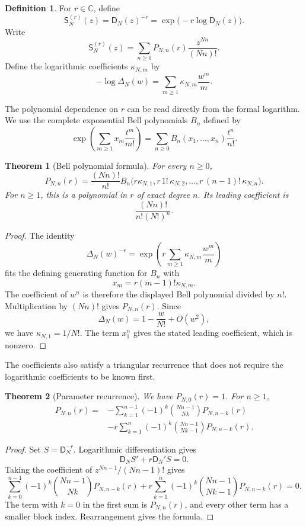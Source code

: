 \documentclass[11pt]{article}
\newtheorem{theorem}{Theorem}[section]
\theoremstyle{definition}
\newtheorem{definition}[definition]{Definition}
\theoremstyle{remark}
\newcommand{\CC}{\mathbb C}
\newcommand{\Dfun}{\mathsf D}
\newcommand{\Sfun}{\mathsf S}
\begin{document}
\begin{definition}\label{def:reciprocal_family}
For $r\in\CC$, define
\[
\Sfun_N^{(r)}(z)
=
\Dfun_N(z)^{-r}
=
\exp\bigl(-r\log\Dfun_N(z)\bigr).
\]
Write
\[
\Sfun_N^{(r)}(z)
=
\sum_{n\geq0}P_{N,n}(r)\frac{z^{Nn}}{(Nn)!}.
\]
Define the logarithmic coefficients $\kappa_{N,m}$ by
\[
-\log\Delta_N(w)
=
\sum_{m\geq1}\kappa_{N,m}\frac{w^m}{m}.
\]
\end{definition}

The polynomial dependence on $r$ can be read directly from the formal logarithm.  We use the complete exponential Bell polynomials $B_n$ defined by
\[
\exp\left(\sum_{m\geq1}x_m\frac{t^m}{m!}\right)
=
\sum_{n\geq0}B_n(x_1,\ldots,x_n)\frac{t^n}{n!}.
\]

\begin{theorem}[Bell polynomial formula]\label{thm:reciprocal_bell}
For every $n\geq0$,
\[
P_{N,n}(r)
=
\frac{(Nn)!}{n!}
B_n\bigl(
 r\kappa_{N,1},
 r\,1!\,\kappa_{N,2},
 \ldots,
 r\,(n-1)!\,\kappa_{N,n}
\bigr).
\]
For $n\geq1$, this is a polynomial in $r$ of exact degree $n$.  Its leading coefficient is
\[
\frac{(Nn)!}{n!(N!)^n}.
\]
\end{theorem}

\begin{proof}
The identity
\[
\Delta_N(w)^{-r}
=
\exp\left(
 r\sum_{m\geq1}\kappa_{N,m}\frac{w^m}{m}
\right)
\]
fits the defining generating function for $B_n$ with
\[
x_m=r(m-1)!\kappa_{N,m}.
\]
The coefficient of $w^n$ is therefore the displayed Bell polynomial divided by $n!$.  Multiplication by $(Nn)!$ gives $P_{N,n}(r)$.  Since
\[
\Delta_N(w)=1-\frac{w}{N!}+O(w^2),
\]
we have $\kappa_{N,1}=1/N!$.  The term $x_1^n$ gives the stated leading coefficient, which is nonzero.
\end{proof}

The coefficients also satisfy a triangular recurrence that does not require the logarithmic coefficients to be known first.

\begin{theorem}[Parameter recurrence]\label{thm:parameter_recurrence}
We have $P_{N,0}(r)=1$.  For $n\geq1$,
\[
\begin{aligned}
P_{N,n}(r)
={}&-
\sum_{k=1}^{n-1}
(-1)^k
\binom{Nn-1}{Nk}
P_{N,n-k}(r)
\\
&-r
\sum_{k=1}^{n}
(-1)^k
\binom{Nn-1}{Nk-1}
P_{N,n-k}(r).
\end{aligned}
\]
\end{theorem}

\begin{proof}
Set $S=\Dfun_N^{-r}$.  Logarithmic differentiation gives
\[
\Dfun_NS'+r\Dfun_N'S=0.
\]
Taking the coefficient of $z^{Nn-1}/(Nn-1)!$ gives
\[
\sum_{k=0}^{n-1}(-1)^k
\binom{Nn-1}{Nk}P_{N,n-k}(r)
+r\sum_{k=1}^{n}(-1)^k
\binom{Nn-1}{Nk-1}P_{N,n-k}(r)=0.
\]
The term with $k=0$ in the first sum is $P_{N,n}(r)$, and every
other term has a smaller block index.  Rearrangement gives the formula.
\end{proof}
\end{document}
